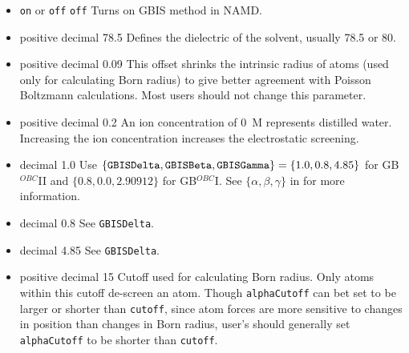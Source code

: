 \begin{itemize}

\item
{} {{\tt on} or {\tt off}} {{\tt off}} {Turns on GBIS method in NAMD. }

\item
{} {positive decimal} {78.5} {Defines the dielectric of the solvent, usually 78.5 or 80.}

\item
{} {positive decimal} {0.09} {This offset shrinks the intrinsic radius of atoms (used only for calculating Born radius) to give better agreement with Poisson Boltzmann calculations. Most users should not change this parameter.}

\item
{} {positive decimal} {0.2} {An ion concentration of 0~M represents distilled water. Increasing the ion concentration increases the electrostatic screening.}

\item
{} {decimal} {1.0} {Use $\{{\tt GBISDelta}, {\tt GBISBeta},{\tt GBISGamma}\} = \{1.0, 0.8, 4.85\}$ for GB$^{OBC}$II and $\{0.8, 0.0, 2.90912\}$ for GB$^{OBC}$I. See $\{\alpha, \beta, \gamma\}$ in \cite{ONUF04} for more information.}

\item
{} {decimal} {0.8} {See {\tt GBISDelta}.}

\item
{} {decimal} {4.85} {See {\tt GBISDelta}.}

\item
{} {positive decimal} {15} {Cutoff used for calculating Born radius. Only atoms within this cutoff de-screen an atom. Though {\tt alphaCutoff} can bet set to be larger or shorter than {\tt cutoff}, since atom forces are more sensitive to changes in position than changes in Born radius, user's should generally set {\tt alphaCutoff} to be shorter than {\tt cutoff}.}


\end{itemize}


